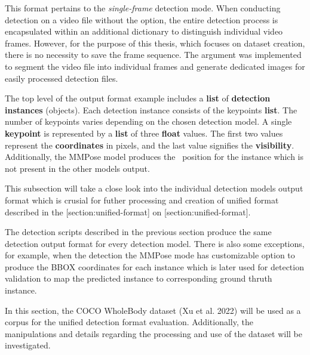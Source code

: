 
This format pertains to the {\em single-frame} detection mode. When conducting detection on a video file without the  option, the entire detection process is encapsulated within an additional dictionary to distinguish individual video frames. However, for the purpose of this thesis, which focuses on dataset creation, there is no necessity to save the frame sequence. The  argument was implemented to segment the video file into individual frames and generate dedicated images for easily processed detection files.

The top level of the output format example includes a {\bf list} of {\bf detection instances} (objects). Each detection instance consists of the keypoints {\bf list}. The number of keypoints varies depending on the chosen detection model. A single {\bf keypoint} is represented by a {\bf list} of three {\bf float} values. The first two values represent the {\bf coordinates} in pixels, and the last value signifies the {\bf visibility}. Additionally, the MMPose model produces the \BBOX\ position for the instance which is not present in the other models output.

This subsection will take a close look into the individual detection models output format which is crusial for futher processing and creation of unified format described in the [section:unified-format] on [section:unified-format].

The detection scripts described in the previous section produce the same detection output format for every detection model. There is also some exceptions, for example, when the detection the MMPose mode has customizable option to produce the BBOX coordinates for each instance which is later used for detection validation to map the predicted instance to corresponding ground thruth instance.

In this section, the COCO WholeBody dataset (Xu et al. 2022) will be used as a corpus for the unified detection format evaluation. Additionally, the manipulations and details regarding the processing and use of the dataset will be investigated.

